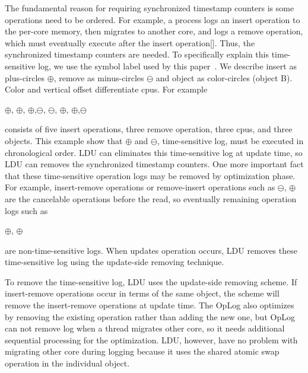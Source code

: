The fundamental reason for requiring synchronized timestamp counters is some
operations need to be ordered.
For example, a process logs an insert operation to the per-core memory, then
migrates to another core, and logs a remove operation, which must eventually
execute after the insert operation[].
Thus, the synchronized timestamp counters are needed.
To specifically explain this time-sensitive log, we use the symbol label used by
this paper~\cite{Clements15SCR}.
We describe insert as plus-circles $\oplus$, remove as minus-circles
$\ominus$ and object as color-circles (object B). 
Color and vertical offset differentiate cpus.
For example
\begin{center}
$\oplus$, $\oplus$, $\oplus$,$\ominus$,
$\ominus$, $\oplus$, $\oplus$,$\ominus$
\end{center}
consists of five insert operations, three remove operation, three cpus, and
three objects.
This example show that $\oplus$ and $\ominus$,
time-sensitive log, must be executed in chronological order.
LDU can eliminates this time-sensitive log at update time, so LDU can removes
the synchronized timestamp counters.
One more important fact that these time-sensitive operation logs may be removed
by optimization phase.
For example, insert-remove operations or remove-insert operations such as 
$\ominus$, $\oplus$ are the cancelable operations before
the read, so eventually remaining operation logs such as
\begin{center}
 $\oplus$, $\oplus$
\end{center}
are non-time-sensitive logs.
When updates operation occurs, LDU removes these time-sensitive log using
the update-side removing technique.


To remove the time-sensitive log, LDU uses the update-side removing scheme.
If insert-remove operations occur in terms of the same object, the scheme will
remove the insert-remove operations at update time.
The OpLog also optimizes by removing the existing operation rather than
adding the new one, but OpLog can not remove log when a thread 
migrates other core, so it needs additional sequential processing for
the optimization.
LDU, however, have no problem with migrating other core during logging because
it uses the shared atomic swap operation in the individual object.


